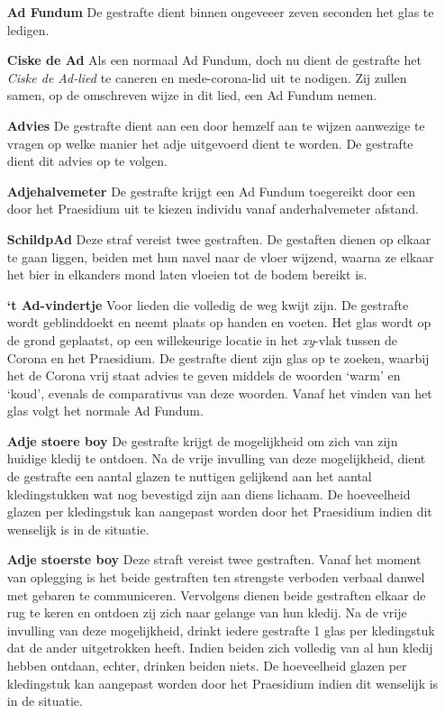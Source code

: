 \begin{itemize}
    \item[\textbf{Ad Fundum}] De gestrafte dient binnen ongeveeer zeven seconden het glas te ledigen.
    
    \item[\textbf{Ciske de Ad}] Als een normaal Ad Fundum, doch nu dient de gestrafte het \textit{Ciske de Ad-lied} te caneren en mede-corona-lid uit te nodigen. Zij zullen samen, op de omschreven wijze in dit lied, een Ad Fundum nemen.
    
    \item[\textbf{Advies}] De gestrafte dient aan een door hemzelf aan te wijzen aanwezige te vragen op welke manier het adje uitgevoerd dient te worden. De gestrafte dient dit advies op te volgen.

    \item[\textbf{Adjehalvemeter}] De gestrafte krijgt een Ad Fundum toegereikt door een door het Praesidium uit te kiezen individu vanaf anderhalvemeter afstand.
    
    \item[\textbf{SchildpAd}] Deze straf vereist twee gestraften. De gestaften dienen op elkaar te gaan liggen, beiden met hun navel naar de vloer wijzend, waarna ze elkaar het bier in elkanders mond laten vloeien tot de bodem bereikt is.
    
    \item[\textbf{‘t Ad-vindertje}] Voor lieden die volledig de weg kwijt zijn. De gestrafte wordt geblinddoekt en neemt plaats op handen en voeten. Het glas wordt op de grond geplaatst, op een willekeurige locatie in het \textit{xy}-vlak tussen de Corona en het Praesidium. De gestrafte dient zijn glas op te zoeken, waarbij het de Corona vrij staat advies te geven middels de woorden ‘warm’ en ‘koud’, evenals de comparativus van deze woorden. Vanaf het vinden van het glas volgt het normale Ad Fundum.
    
    \item[\textbf{Adje stoere boy}] De gestrafte krijgt de mogelijkheid om zich van zijn huidige kledij te ontdoen. Na de vrije invulling van deze mogelijkheid, dient de gestrafte een aantal glazen te nuttigen gelijkend aan het aantal kledingstukken wat nog bevestigd zijn aan diens lichaam. De hoeveelheid glazen per kledingstuk kan aangepast worden door het Praesidium indien dit wenselijk is in de situatie. 
    
    \item[\textbf{Adje stoerste boy}] Deze straft vereist twee gestraften. Vanaf het moment van oplegging is het beide gestraften ten strengste verboden verbaal danwel met gebaren te communiceren. Vervolgens dienen beide gestraften elkaar de rug te keren en ontdoen zij zich naar gelange van hun kledij. Na de vrije invulling van deze mogelijkheid, drinkt iedere gestrafte 1 glas per kledingstuk dat de ander uitgetrokken heeft. Indien beiden zich volledig van al hun kledij hebben ontdaan, echter, drinken beiden niets. De hoeveelheid glazen per kledingstuk kan aangepast worden door het Praesidium indien dit wenselijk is in de situatie. 


\end{itemize}
